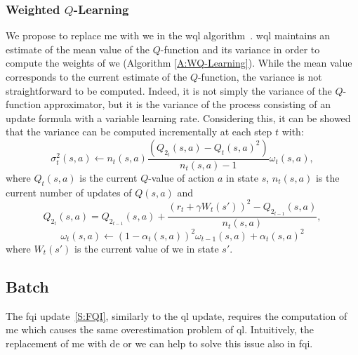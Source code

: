 \subsubsection{Weighted $Q$-Learning}
We propose to replace \gls{me} with \gls{we} in the \gls{wql} algorithm~\cite{deramo2016estimating}. \gls{wql} maintains an estimate of the mean value of the $Q$-function and its variance in order to compute the weights of \gls{we} (Algorithm \ref{A:WQ-Learning}).
While the mean value corresponds to the current estimate of the $Q$-function, the variance is not straightforward to be computed. Indeed, it is not simply the variance of the $Q$-function approximator, but it is the variance of the process consisting of an update formula with a variable learning rate. Considering this, it can be showed that the variance can be computed incrementally at each step $t$ with:
$$\sigma^2_t(s,a) \leftarrow n_t(s,a) \dfrac{(Q_{2_t}(s,a) - Q_t(s,a)^2)}{n_t(s,a) - 1} \omega_t(s,a),$$
where $Q_t(s,a)$ is the current $Q$-value of action $a$ in state $s$, $n_t(s,a)$ is the current number of updates of $Q(s,a)$ and
$$Q_{2_t}(s,a) = Q_{2_{t-1}}(s,a) + \dfrac{(r_t + \gamma W_t(s'))^2 - Q_{2_{t-1}}(s,a)}{n_t(s,a)},$$
$$\omega_t(s,a) \leftarrow (1 - \alpha_t(s,a))^2 \omega_{t-1}(s,a) + \alpha_t(s,a)^2$$
where $W_t(s')$ is the current value of \gls{we} in state $s'$.

\subsection{Batch}
The \gls{fqi} update~\ref{S:FQI}, similarly to the \gls{ql} update, requires the computation of \gls{me} which causes the same overestimation problem of \gls{ql}. Intuitively, the replacement of \gls{me} with \gls{de} or \gls{we} can help to solve this issue also in \gls{fqi}.

